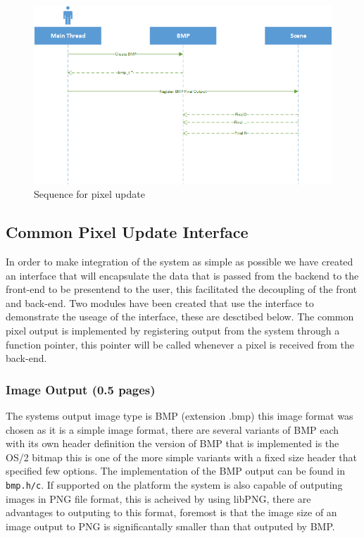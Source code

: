 \begin{figure}
\centering
\includegraphics[width=\textwidth]{./images/pixel_update_sequence.png}
\caption{Sequence for pixel update}
\end{figure}

\subsection{Common Pixel Update Interface}
In order to make integration of the system as simple as possible we have created an interface that will encapsulate the data
that is passed from the backend to the front-end to be presentend to the user, this facilitated the decoupling of the front
and back-end. Two modules have been created that use the interface to demonstrate the useage of the interface, these are
desctibed below. The common pixel output is implemented by registering output from the system through a function pointer,
this pointer will be called whenever a pixel is received from the back-end.

\subsubsection{Image Output (0.5 pages)}

The systems output image type is BMP (extension .bmp) this image format was chosen as it is a simple image format, there are
several variants of BMP each with its own header definition the version of BMP that is implemented is the OS/2 bitmap this is
one of the more simple variants with a fixed size header that specified few options. The implementation of the BMP output can
be found in \texttt{bmp.h/c}. If supported on the platform the system is also capable of outputing images in PNG file format,
this is acheived by using libPNG, there are advantages to outputing to this format, foremost is that the image size of an
image output to PNG is significantally smaller than that outputed by BMP.

